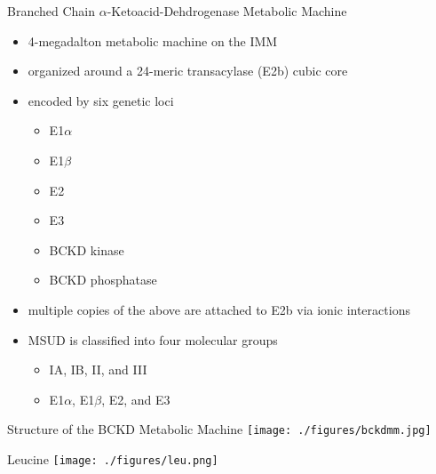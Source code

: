 \documentclass[presentation, smaller]{beamer}
\begin{document}
\begin{frame}[label={sec:orgheadline9}]{Branched Chain \(\alpha\)-Ketoacid-Dehdrogenase Metabolic Machine}
\begin{itemize}
\item 4-megadalton metabolic machine on the IMM
\item organized around a 24-meric transacylase (E2b) cubic core
\item encoded by six genetic loci
\begin{itemize}
\item E1\(\alpha\)
\item E1\(\beta\)
\item E2
\item E3
\item BCKD kinase
\item BCKD phosphatase
\end{itemize}
\item multiple copies of the above are attached to E2b via ionic interactions
\item MSUD is classified into four molecular groups
\begin{itemize}
\item IA, IB, II, and III
\item E1\(\alpha\), E1\(\beta\), E2, and E3
\end{itemize}
\end{itemize}
\end{frame}

\begin{frame}[label={sec:orgheadline10}]{Structure of the BCKD Metabolic Machine}
\centering
\texttt{[image: ./figures/bckdmm.jpg]}
\end{frame}

\begin{frame}[label={sec:orgheadline11}]{Leucine}
\centering
\texttt{[image: ./figures/leu.png]}
\end{frame}
\end{document}
